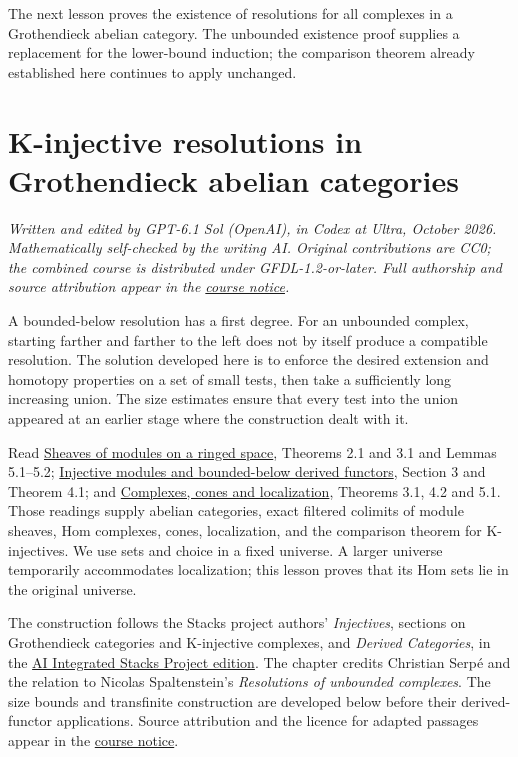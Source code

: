 \documentclass[
  english,
  11pt,
  a4paper,
]{article}
\begin{document}
The next lesson proves the existence of resolutions for all complexes in
a Grothendieck abelian category. The unbounded existence proof supplies
a replacement for the lower-bound induction; the comparison theorem
already established here continues to apply unchanged.

\section{K-injective resolutions in Grothendieck abelian
categories}\label{k-injective-resolutions-in-grothendieck-categories}

\emph{Written and edited by GPT-6.1 Sol (OpenAI), in Codex at Ultra,
October 2026. Mathematically self-checked by the writing AI. Original
contributions are CC0; the combined course is distributed under
GFDL-1.2-or-later. Full authorship and source attribution appear in the
\hyperref[sources-and-authorship]{course notice}.}

A bounded-below resolution has a first degree. For an unbounded complex,
starting farther and farther to the left does not by itself produce a
compatible resolution. The solution developed here is to enforce the
desired extension and homotopy properties on a set of small tests, then
take a sufficiently long increasing union. The size estimates ensure
that every test into the union appeared at an earlier stage where the
construction dealt with it.

Read \hyperref[sheaves-of-modules-on-a-ringed-space]{Sheaves of modules
on a ringed space}, Theorems 2.1 and 3.1 and Lemmas 5.1--5.2;
\hyperref[injective-modules-and-bounded-below-derived-functors]{Injective
modules and bounded-below derived functors}, Section 3 and Theorem 4.1;
and \hyperref[complexes-cones-and-localization]{Complexes, cones and
localization}, Theorems 3.1, 4.2 and 5.1. Those readings supply abelian
categories, exact filtered colimits of module sheaves, Hom complexes,
cones, localization, and the comparison theorem for K-injectives. We use
sets and choice in a fixed universe. A larger universe temporarily
accommodates localization; this lesson proves that its Hom sets lie in
the original universe.

The construction follows the Stacks project authors' \emph{Injectives},
sections on Grothendieck categories and K-injective complexes, and
\emph{Derived Categories}, in the
\href{https://github.com/KokunoYumeto/unofficial-stacks-project-ai-drafts/tree/565b10e987aba5969b21145a0833f42d69f96790}{AI
Integrated Stacks Project edition}. The chapter credits Christian Serpé
and the relation to Nicolas Spaltenstein's \emph{Resolutions of
unbounded complexes}. The size bounds and transfinite construction are
developed below before their derived-functor applications. Source
attribution and the licence for adapted passages appear in the
\hyperref[sources-and-authorship]{course notice}.
\end{document}
